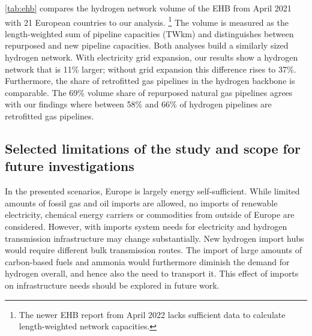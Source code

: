 
\cref{tab:ehb} compares the hydrogen network volume of the EHB from April 2021 with 21 European countries
to our analysis. \cite{gasforclimateExtendingEuropean2021}\footnote{The newer
EHB report from April 2022 \cite{gasforclimateEuropeanHydrogen2022} lacks sufficient
data to calculate length-weighted network capacities.} The volume is measured
as the length-weighted sum of pipeline capacities (TWkm) and distinguishes
between repurposed and new pipeline capacities. Both analyses build a similarly
sized hydrogen network. With electricity grid expansion, our results show a
hydrogen network that is 11\% larger; without grid expansion this difference
rises to 37\%. Furthermore, the share of retrofitted gas pipelines in the
hydrogen backbone is comparable. The 69\% volume share of repurposed natural gas
pipelines \cite{gasforclimateExtendingEuropean2021} agrees with our findings
where between 58\% and 66\% of hydrogen pipelines are retrofitted gas pipelines.

\subsection*{Selected limitations of the study and scope for future investigations}

In the presented scenarios, Europe is largely energy self-sufficient. While
limited amounts of fossil gas and oil imports are allowed, no imports of
renewable electricity, chemical energy carriers or commodities from outside of
Europe are considered. However, with imports system needs for electricity and
hydrogen transmission infrastructure may change substantially. New hydrogen
import hubs would require different bulk transmission routes. The import of
large amounts of carbon-based fuels and ammonia would furthermore diminish the
demand for hydrogen overall, and hence also the need to transport it. This
effect of imports on infrastructure needs should be explored in future work.
\cite{fasihiTechnoeconomicAssessment2019,heuserTechnoeconomicAnalysis2019,hamppImportOptions2021}

